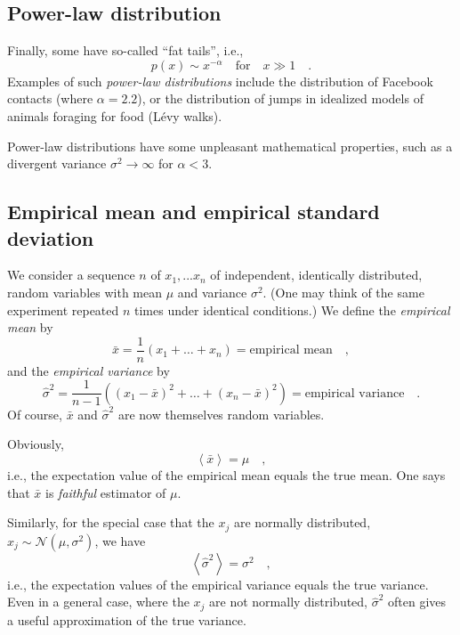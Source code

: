 \documentclass{notebook}
\begin{document}
\subsection*{Power-law distribution}
Finally, some have so-called ``fat tails'', i.e.,
\begin{equation}
p(x) \sim x^{- \alpha} \quad \mathrm{for} \quad x \gg 1 \quad.
\end{equation}
Examples of such \textit{power-law distributions} include the distribution of Facebook contacts (where $\alpha = 2.2$), 
or the distribution of jumps in idealized models of animals foraging for food (L\'evy walks).

Power-law distributions have some unpleasant mathematical properties,
such as a divergent variance $\sigma^2 \to \infty $ for $\alpha < 3$.

\subsection{Empirical mean and empirical standard deviation}

We consider a sequence $n$ of $x_1, ... x_n$ of independent, identically distributed, random variables with mean $\mu$ and variance $\sigma^2$.  (One may think of the same experiment repeated $n$ times under identical conditions.)
We define the \textit{empirical mean} by
%
\begin{equation}
\bar{x} = \frac{1}{n}(x_1 + \dots + x_n) = \text{empirical mean} \quad,
\end{equation}
%
and the \textit{empirical variance} by 
%
\begin{equation}
\widehat{\sigma}^2 = \frac{1}{n-1} \left(
	\left(x_1-\bar{x}\right)^2  + \dots + \left(x_n-\bar{x}\right)^2
	\right)
	= \text{empirical variance} \quad.
\end{equation}
%
Of course, $\bar{x}$ and $\widehat{\sigma}^2$ are now themselves random variables.

Obviously, 
\begin{equation}
\left\langle \bar{x} \right\rangle = \mu \quad,
\end{equation}
i.e., the expectation value of the empirical mean equals the true mean. One says that $\bar{x}$ is \textit{faithful} estimator of $\mu$.

Similarly, for the special case that the $x_j$ are normally distributed, 
$x_j\sim\mathcal{N}(\mu,\sigma^2)$,
we have
\begin{equation}
\left\langle \widehat{\sigma}^2 \right\rangle = \sigma^2 \quad,
\end{equation}
i.e., the expectation values of the empirical variance equals the true variance.
Even in a general case, where the $x_j$ are not normally distributed, 
$\widehat{\sigma}^2$ often gives a useful approximation of the true variance.
\end{document}
